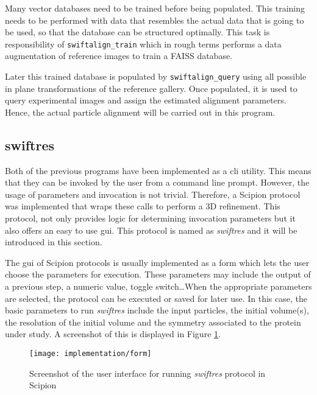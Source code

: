 \documentclass[../main.tex]{subfiles}
\begin{document}
Many vector databases need to be trained before being populated. This training needs to be performed with data that resembles the actual data that is going to be used, so that the database can be structured optimally. This task is responsibility of \texttt{swiftalign\_train} which in rough terms performs a data augmentation of reference images to train a FAISS database.

Later this trained database is populated by \texttt{swiftalign\_query} using all possible in plane transformations of the reference gallery. Once populated, it is used to query experimental images and assign the estimated alignment parameters. Hence, the actual particle alignment will be carried out in this program.

\subsection{swiftres}
Both of the previous programs have been implemented as a \gls{cli} utility. This means that they can be invoked by the user from a command line prompt. However, the usage of parameters and invocation is not trivial. Therefore, a Scipion protocol was implemented that wraps these calls to perform a 3D refinement. This protocol, not only provides logic for determining invocation parameters but it also offers an easy to use \gls{gui}. This protocol is named as \textit{swiftres} and it will be introduced in this section.

The \gls{gui} of Scipion protocols is usually implemented as a form which lets the user choose the parameters for execution. These parameters may include the output of a previous step, a numeric value, toggle switch\dots When the appropriate parameters are selected, the protocol can be executed or saved for later use. In this case, the basic parameters to run \textit{swiftres} include the input particles, the initial volume(s), the resolution of the initial volume and the symmetry associated to the protein under study. A screenshot of this is displayed in Figure \ref{fig:4:form}.

\begin{figure}[htbp]
    \centering
    \texttt{[image: implementation/form]}
    \caption{Screenshot of the user interface for running \textit{swiftres} protocol in Scipion}
    \label{fig:4:form}
\end{figure}
\end{document}
